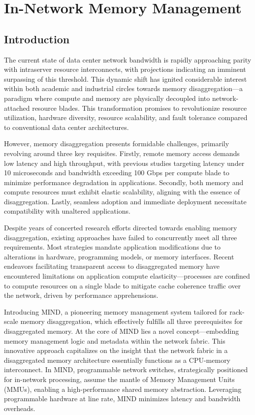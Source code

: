 \section{In-Network Memory Management}
\subsection{Introduction}
The current state of data center network bandwidth is rapidly approaching parity with intraserver resource interconnects, with projections indicating an imminent surpassing of this threshold. This dynamic shift has ignited considerable interest within both academic and industrial circles towards memory disaggregation—a paradigm where compute and memory are physically decoupled into network-attached resource blades. This transformation promises to revolutionize resource utilization, hardware diversity, resource scalability, and fault tolerance compared to conventional data center architectures.

However, memory disaggregation presents formidable challenges, primarily revolving around three key requisites. Firstly, remote memory access demands low latency and high throughput, with previous studies targeting latency under 10 microseconds and bandwidth exceeding 100 Gbps per compute blade to minimize performance degradation in applications. Secondly, both memory and compute resources must exhibit elastic scalability, aligning with the essence of disaggregation. Lastly, seamless adoption and immediate deployment necessitate compatibility with unaltered applications.

Despite years of concerted research efforts directed towards enabling memory disaggregation, existing approaches have failed to concurrently meet all three requirements. Most strategies mandate application modifications due to alterations in hardware, programming models, or memory interfaces. Recent endeavors facilitating transparent access to disaggregated memory have encountered limitations on application compute elasticity—processes are confined to compute resources on a single blade to mitigate cache coherence traffic over the network, driven by performance apprehensions.

Introducing MIND, a pioneering memory management system tailored for rack-scale memory disaggregation, which effectively fulfills all three prerequisites for disaggregated memory. At the core of MIND lies a novel concept—embedding memory management logic and metadata within the network fabric. This innovative approach capitalizes on the insight that the network fabric in a disaggregated memory architecture essentially functions as a CPU-memory interconnect. In MIND, programmable network switches, strategically positioned for in-network processing, assume the mantle of Memory Management Units (MMUs), enabling a high-performance shared memory abstraction. Leveraging programmable hardware at line rate, MIND minimizes latency and bandwidth overheads.

